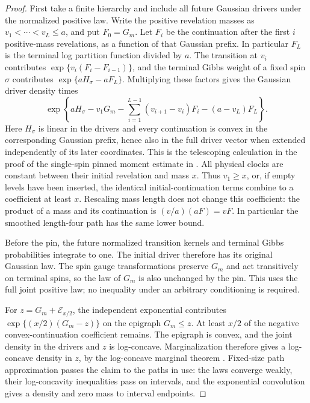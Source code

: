 \begin{proof}
First take a finite hierarchy and include all future Gaussian drivers
under the normalized positive law. Write the positive revelation masses
as \(v_1<\cdots<v_L\le a\), and put \(F_0=G_m\). Let \(F_i\)
be the continuation after the first \(i\) positive-mass revelations,
as a function of that Gaussian prefix. In particular \(F_L\) is the
terminal log partition function divided by \(a\). The transition at
\(v_i\) contributes \(\exp\{v_i(F_i-F_{i-1})\}\), and the terminal
Gibbs weight of a fixed spin \(\sigma\) contributes
\(\exp\{aH_\sigma-aF_L\}\). Multiplying these factors gives the
Gaussian driver density times
\[
 \exp\!\left\{
 aH_\sigma-v_1G_m
 -\sum_{i=1}^{L-1}(v_{i+1}-v_i)F_i-(a-v_L)F_L
 \right\}.
\]
Here \(H_\sigma\) is linear in the drivers and every continuation is
convex in the corresponding Gaussian prefix, hence also in the full
driver vector when extended independently of its later coordinates.
This is the telescoping
calculation in the proof of the single-spin pinned moment estimate in
\cite[Lemma~2.3]{PE}.
All physical clocks are constant between their initial revelation and
mass \(x\). Thus \(v_1\ge x\), or, if empty levels have been inserted,
the identical initial-continuation terms combine to a coefficient at
least \(x\). Rescaling mass length does not change this coefficient:
the product of a mass and its continuation is
\((v/a)(aF)=vF\). In particular the smoothed length-four path has the
same lower bound.

Before the pin, the future normalized transition kernels and terminal
Gibbs probabilities integrate to one. The initial driver therefore has
its original Gaussian law. The spin gauge transformations preserve
\(G_m\) and act transitively on terminal spins, so the law of \(G_m\)
is also unchanged by the pin. This uses the full joint positive law;
no inequality under an arbitrary conditioning is required.

For \(z=G_m+\mathcal E_{x/2}\), the independent exponential contributes
\(\exp\{(x/2)(G_m-z)\}\) on the epigraph \(G_m\le z\).
At least \(x/2\) of the negative convex-continuation coefficient
remains. The epigraph is convex, and the joint density in the drivers
and \(z\) is log-concave. Marginalization therefore gives a log-concave
density in \(z\), by the log-concave marginal theorem
\cite{Prekopa1973}. Fixed-size path approximation passes the claim to
the paths in use: the laws converge weakly, their log-concavity
inequalities pass on intervals, and the exponential convolution gives
a density and zero mass to interval endpoints.


\end{proof}

